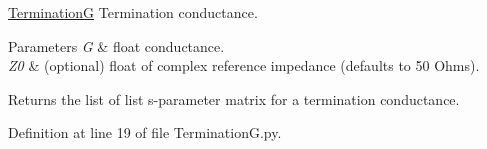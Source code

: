 \hyperlink{namespaceSignalIntegrity_1_1Devices_1_1TerminationG}{TerminationG} Termination conductance. 


\begin{DoxyParams}{Parameters}
{\em G} & float conductance. \\
\hline
{\em Z0} & (optional) float of complex reference impedance (defaults to 50 Ohms). \\
\hline
\end{DoxyParams}
\begin{DoxyReturn}{Returns}
the list of list s-\/parameter matrix for a termination conductance. 
\end{DoxyReturn}


Definition at line 19 of file Termination\+G.\+py.

